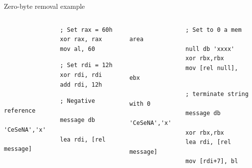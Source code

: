 \begin{frame}{Zero-byte removal example}
	\acodenonu
	\begin{columns}[T]
		\begin{column}{.5\textwidth}
			\begin{lstlisting}
				; Set rax = 60h
				xor rax, rax
				mov al, 60
			\end{lstlisting}
			\begin{lstlisting}
				; Set rdi = 12h
				xor rdi, rdi
				add rdi, 12h	
			\end{lstlisting}
			\begin{lstlisting}
				; Negative reference
				message db 'CeSeNA','x'
				lea rdi, [rel message]
			\end{lstlisting}
		\end{column}
		\begin{column}{.5\textwidth}
			\begin{lstlisting}
				; Set to 0 a mem area
				null db 'xxxx'
				xor rbx,rbx
				mov [rel null], ebx
			\end{lstlisting}
			\begin{lstlisting}
				; terminate string with 0
				message db 'CeSeNA','x'
				xor rbx,rbx
				lea rdi, [rel message]
				mov [rdi+7], bl
			\end{lstlisting}
		\end{column}
\end{columns}

\end{frame}
